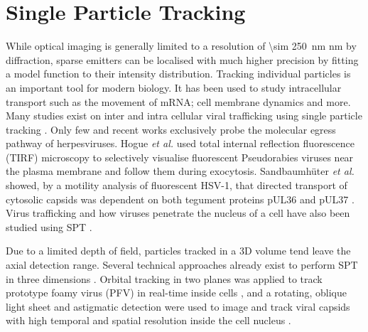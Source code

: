 \section{Single Particle Tracking}

While optical imaging is generally limited to a resolution of \SI{\sim 250}{\nano\metre} nm by diffraction, sparse emitters can be localised with much higher precision by fitting a model function to their intensity distribution.
Tracking individual particles is an important tool for modern biology.
It has been used to study intracellular transport such as the movement of mRNA\cite{Spille2015a}; cell membrane dynamics\cite{Cognet2014} and more.
Many studies exist on inter and intra cellular viral trafficking
using single particle tracking \cite{(reviewed in [43])}.
Only few and recent works exclusively probe the molecular egress pathway of herpesviruses.
Hogue \emph{et al.} \cite{[16]} used total internal reflection fluorescence (TIRF) microscopy to selectively visualise fluorescent Pseudorabies viruses near the plasma membrane and follow them during exocytosis.
Sandbaumhüter \emph{et al.} showed, by a motility analysis of fluorescent HSV-1, that directed transport of cytosolic capsids was dependent on both tegument proteins pUL36 and pUL37 \cite{[44]}.
Virus trafficking and how viruses penetrate the nucleus of a cell have also been studied using SPT \cite{Brandenburg2007}.

Due to a limited depth of field, particles tracked in a 3D volume tend leave the axial detection range.
Several technical approaches already exist to perform SPT in three dimensions \cite{[46-49]}.
Orbital tracking in two planes was applied to track prototype foamy virus (PFV) in real-time inside cells \cite{[50]}, and a rotating, oblique light sheet and astigmatic detection were used to image and track viral capsids with high temporal and spatial resolution inside the cell nucleus \cite{[19]}.

